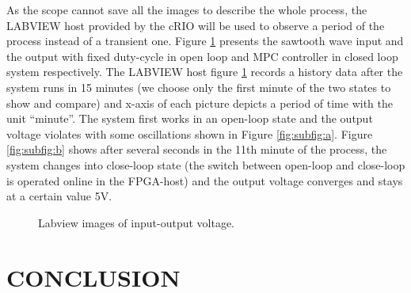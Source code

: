 \documentclass[journal]{IEEEtran}
\begin{document}
As the scope cannot save all the images to describe the whole process, the LABVIEW host provided by the cRIO will be used to observe a period of the process instead of a transient one. Figure \ref{fig:subfig} presents the sawtooth wave input and the output with fixed duty-cycle in open loop and MPC controller in closed loop system respectively. The LABVIEW host figure \ref{fig:subfig} records a history data after the system runs in 15 minutes (we choose only the first minute of the two states to show and compare) and x-axis of each picture depicts a period of time with the unit ``minute''. The system first works in an open-loop state and the output voltage violates with some oscillations shown in Figure \ref{fig:subfig:a}. Figure \ref{fig:subfig:b} shows  after several seconds in the 11th minute of the process, the system changes into close-loop state (the switch between open-loop and close-loop is operated online in the FPGA-host) and the output voltage converges and stays at a certain value 5V.
\begin{figure}
	\centering
	\hspace{0.5in}
	\caption{Labview images of input-output voltage. }
	\label{fig:subfig}
\end{figure}

\section{CONCLUSION} \label{sec:conclusion}
\end{document}
